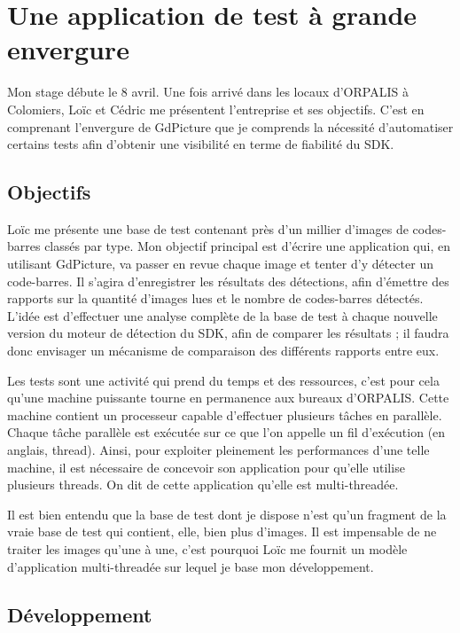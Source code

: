 \chapter{Une application de test à grande envergure}

Mon stage débute le 8 avril. Une fois arrivé dans les locaux d'ORPALIS à Colomiers, Loïc et Cédric me présentent l'entreprise et ses objectifs.
C'est en comprenant l'envergure de GdPicture que je comprends la nécessité d'automatiser certains tests afin d'obtenir une visibilité en terme de fiabilité du SDK.

\section{Objectifs}

Loïc me présente une base de test contenant près d'un millier d'images de codes-barres classés par type.
Mon objectif principal est d'écrire une application qui, en utilisant GdPicture, va passer en revue chaque image et tenter d'y détecter un code-barres.
Il s'agira d'enregistrer les résultats des détections, afin d'émettre des rapports sur la quantité d'images lues et le nombre de codes-barres détectés.
L'idée est d'effectuer une analyse complète de la base de test à chaque nouvelle version du moteur de détection du SDK, afin de comparer les résultats ; il faudra donc envisager un mécanisme de comparaison des différents rapports entre eux.

Les tests sont une activité qui prend du temps et des ressources, c'est pour cela qu'une machine puissante tourne en permanence aux bureaux d'ORPALIS.
Cette machine contient un processeur capable d'effectuer plusieurs tâches en parallèle. Chaque tâche parallèle est exécutée sur ce que l'on appelle un fil d'exécution (en anglais, \og thread\fg ).
Ainsi, pour exploiter pleinement les performances d'une telle machine, il est nécessaire de concevoir son application pour qu'elle utilise plusieurs threads. On dit de cette application qu'elle est multi-threadée.

Il est bien entendu que la base de test dont je dispose n'est qu'un fragment de la vraie base de test qui contient, elle, bien plus d'images.
Il est impensable de ne traiter les images qu'une à une, c'est pourquoi Loïc me fournit un modèle d'application multi-threadée sur lequel je base mon développement.

\section{Développement}

